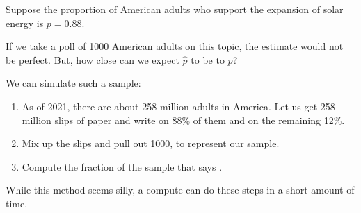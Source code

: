 \documentclass{beamer}
\begin{document}
\begin{frame}
  \begin{example}\label{solar energy}
    \vspace{-2mm} %
    Suppose the proportion of American adults who support the expansion of solar energy is $p=0.88$.\pause


    \vspace{1mm}
    If we take a poll of 1000 American adults on this topic, the estimate would not be perfect. But, how close can we expect $\hat{p}$ to be to $p$?\pause

    \vspace{1mm}
    We can simulate such a sample:
    \begin{enumerate}
    \item As of 2021, there are about 258 million adults in America. Let us get 258 million slips of paper and write  on 88\% of them and  on the remaining 12\%.\pause
    \item Mix up the slips and pull out 1000, to represent our sample.\pause
    \item Compute the fraction of the sample that says .\pause
    \end{enumerate}
  \end{example}

  \begin{note}
    While this method seems silly, a compute can do these steps in a short amount of time.
  \end{note}
\end{frame}
\end{document}
